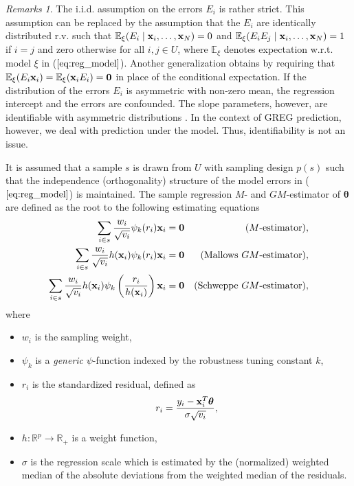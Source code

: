 \documentclass[a4paper,oneside,11pt,DIV=12]{scrartcl}
\theoremstyle{remark}
\newtheorem*{rems}{Remarks}
\newcommand{\R}{\mathbb{R}}
\begin{document}
\begin{rems}
The i.i.d. assumption on the errors $E_i$ is rather strict.
This assumption can be replaced by the assumption that the $E_i$ are
identically distributed r.v. such that $\mathbb{E}_{\xi} (E_i \mid \bold x_i,
\ldots, \bold x_N) = 0$ and $\mathbb{E}_{\xi} (E_i E_j \mid \bold x_i, \ldots,
\bold x_N) = 1$ if $i = j$ and zero otherwise for all $i,j \in U$, where
$\mathbb{E}_{\xi}$ denotes expectation w.r.t. model $\xi$ in
($\ref{eq:reg_model}$). Another generalization obtains by requiring that
$\mathbb{E}_{\xi}(E_i\bold x_i) = \mathbb{E}_{\xi}(\bold x_i E_i) = \bold 0$ in
place of the conditional expectation. If the distribution of the errors $E_i$
is asymmetric with non-zero mean, the regression intercept and the errors are
confounded. The slope parameters, however, are identifiable with asymmetric
distributions \citep{carroll_welsh_1988}. In the context of GREG prediction,
however, we deal with prediction under the model. Thus, identifiability is not
an issue.
\end{rems}

It is assumed that a sample $s$ is drawn from $U$ with sampling design $p(s)$
such that the independence (orthogonality) structure of the model errors in
($\ref{eq:reg_model}$) is maintained. The sample regression $M$- and
$GM$-estimator of $\boldsymbol{\theta}$ are defined as the root to the
following estimating equations \citep[cf.][Chapter
6.3]{hampel_ronchetti_etal_1986}
\begin{align*}
    \sum_{i \in s} \frac{w_i}{\sqrt{v_i}} \psi_k (r_i)\bold x_i &= \bold 0 &
    \text{($M$-estimator)},\\
    \sum_{i \in s} \frac{w_i}{\sqrt{v_i}} h(\bold x_i) \psi_k (r_i) \bold x_i
    &= \bold 0 & \text{(Mallows $GM$-estimator)},\\
    \sum_{i \in s} \frac{w_i}{\sqrt{v_i}} h(\bold x_i)
    \psi_k\left(\frac{r_i}{h(\bold x_i)}\right) \bold x_i &= \bold 0&
    \text{(Schweppe $GM$-estimator)},
\end{align*}
\noindent where
\begin{itemize}
    \item $w_i$ is the sampling weight,
    \item $\psi_k$ is a \emph{generic} $\psi$-function indexed by the robustness
        tuning constant $k$,
    \item $r_i$ is the standardized residual, defined as
    \begin{equation}\label{eq:residuals}
        r_i = \frac{y_i - \bold x_i^T\boldsymbol \theta}{\sigma\sqrt{v_i}},
    \end{equation}
    \item $h:\R^p \rightarrow \R_+ $ is a weight function,
    \item $\sigma$ is the regression scale which is estimated by the
        (normalized) weighted median of the absolute deviations from the
        weighted median of the residuals.
\end{itemize}
\end{document}

